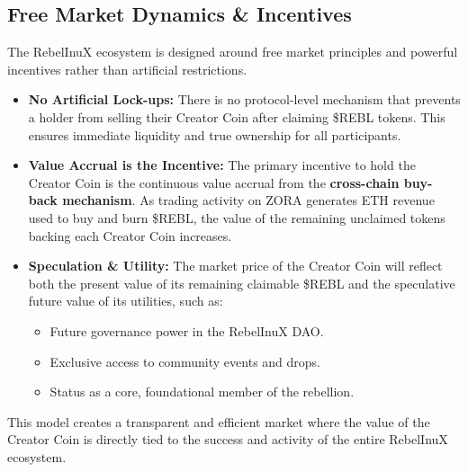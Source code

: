\documentclass{article}
\begin{document}
\begin{tcolorbox}[colback=headerColor!10!white, colframe=headerColor, boxrule=2pt, width=\textwidth, arc=6mm, left=8mm, right=8mm, top=6mm, bottom=6mm]
\subsection[
  \texorpdfstring{\color{primaryColor}Free Market Dynamics \& Incentives}{Free Market Dynamics \& Incentives}
]{\color{primaryColor}Free Market Dynamics \& Incentives}

The RebelInuX ecosystem is designed around free market principles and powerful incentives rather than artificial restrictions.

\begin{itemize}
    \item \textbf{No Artificial Lock-ups:} There is no protocol-level mechanism that prevents a holder from selling their Creator Coin after claiming \$REBL tokens. This ensures immediate liquidity and true ownership for all participants.
    \item \textbf{Value Accrual is the Incentive:} The primary incentive to hold the Creator Coin is the continuous value accrual from the \textbf{cross-chain buy-back mechanism}. As trading activity on ZORA generates ETH revenue used to buy and burn \$REBL, the value of the remaining unclaimed tokens backing each Creator Coin increases.
    \item \textbf{Speculation \& Utility:} The market price of the Creator Coin will reflect both the present value of its remaining claimable \$REBL and the speculative future value of its utilities, such as:
    \begin{itemize}
        \item Future governance power in the RebelInuX DAO.
        \item Exclusive access to community events and drops.
        \item Status as a core, foundational member of the rebellion.
    \end{itemize}
\end{itemize}

This model creates a transparent and efficient market where the value of the Creator Coin is directly tied to the success and activity of the entire RebelInuX ecosystem.
\end{tcolorbox}
\end{document}
